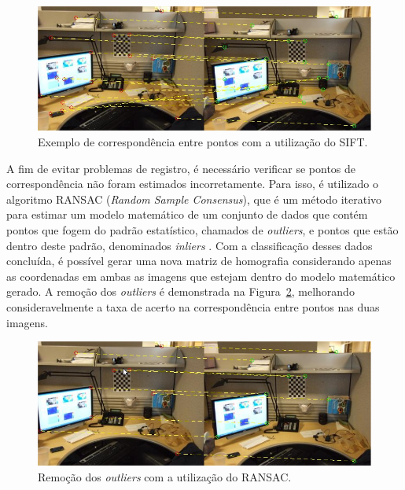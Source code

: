\begin{figure}[htb]
    \caption{Exemplo de correspondência entre pontos com a utilização do SIFT. }
    \centering
    \vspace{0.3cm}
    \begin{minipage}{.9\textwidth}
         \includegraphics[width=\textwidth]{TCC/Imagens/RANSAC_OUTLIERS.jpg}
	\end{minipage}
    \label{fig:RANSAC_OUTLIER}
\end{figure}

A fim de evitar problemas de registro, é necessário verificar se pontos de correspondência não foram estimados incorretamente. Para isso, é utilizado o algoritmo RANSAC (\textit{Random Sample Consensus}), que é um método iterativo para estimar um modelo matemático de um conjunto de dados que contém pontos que fogem do
padrão estatístico, chamados de \textit{outliers}, e pontos que estão dentro deste padrão, denominados \textit{inliers} \cite{Fischler:1981}. Com a classificação desses dados
concluída, é possível gerar uma nova matriz de homografia considerando apenas as coordenadas em ambas as imagens que estejam dentro do modelo matemático gerado. A remoção 
dos \textit{outliers} é demonstrada na Figura~\ref{fig:RANSAC_INLIERS}, melhorando consideravelmente a taxa de acerto na correspondência entre pontos nas duas imagens.

\begin{figure}[htb]
    \caption{Remoção dos \textit{outliers} com a utilização do RANSAC. }
    \centering
    \vspace{0.3cm}
    \begin{minipage}{.9\textwidth}
         \includegraphics[width=\textwidth]{TCC/Imagens/RANSAC_INLIERS.jpg}
	\end{minipage}
    \label{fig:RANSAC_INLIERS}
\end{figure}



